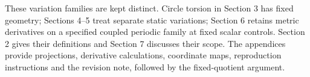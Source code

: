 These variation families are kept distinct. Circle torsion in Section 3 has
fixed geometry; Sections 4--5 treat separate static variations; Section 6
retains metric derivatives on a specified coupled periodic family at fixed
scalar controls. Section 2 gives their definitions and Section 7 discusses
their scope. The appendices provide projections, derivative calculations,
coordinate maps, reproduction instructions and the revision note, followed
by the fixed-quotient argument.
